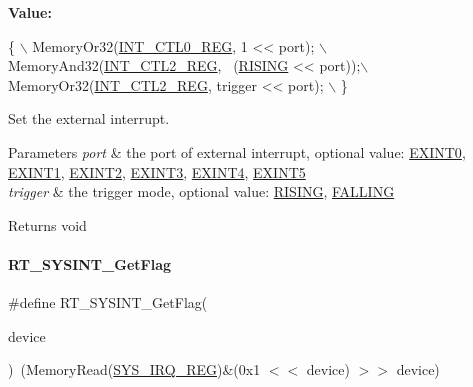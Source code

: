 {\bfseries Value\+:}
\begin{DoxyCode}
\{                                                \(\backslash\)
        MemoryOr32(\mbox{\hyperlink{a00020_adadaa0ab1ebbd7ba9b70dfd24c3ed44da417bb62509b1343f4685a023c8ec4b09}{INT\_CTL0\_REG}}, 1 << port);         \(\backslash\)
        MemoryAnd32(\mbox{\hyperlink{a00020_adadaa0ab1ebbd7ba9b70dfd24c3ed44dafba45e74edabe7b9fd6d0c36e8492bcd}{INT\_CTL2\_REG}}, ~(\mbox{\hyperlink{a00011_aeea2b49478f3b13faedba764985c6e96}{RISING}} << port));\(\backslash\)
        MemoryOr32(\mbox{\hyperlink{a00020_adadaa0ab1ebbd7ba9b70dfd24c3ed44dafba45e74edabe7b9fd6d0c36e8492bcd}{INT\_CTL2\_REG}}, trigger << port);   \(\backslash\)
    \}
\end{DoxyCode}


Set the external interrupt. 


\begin{DoxyParams}{Parameters}
{\em port} & the port of external interrupt, optional value\+: \mbox{\hyperlink{a00011_a2e3f727d359d26314631842394f4a223}{E\+X\+I\+N\+T0}}, \mbox{\hyperlink{a00011_a1ea7d6796165b98f1bc6bf6fe841c3d9}{E\+X\+I\+N\+T1}}, \mbox{\hyperlink{a00011_ac959f4d8aed4e04e25c966e6c8315431}{E\+X\+I\+N\+T2}}, \mbox{\hyperlink{a00011_ae8428c0cbd7362b90ea048bcf59aef2c}{E\+X\+I\+N\+T3}}, \mbox{\hyperlink{a00011_a719b5fa27b5469e1fe2844e9930fa249}{E\+X\+I\+N\+T4}}, \mbox{\hyperlink{a00011_a309fb21107f9f6261cd7e7ca9de6c2f2}{E\+X\+I\+N\+T5}} \\
\hline
{\em trigger} & the trigger mode, optional value\+: \mbox{\hyperlink{a00011_aeea2b49478f3b13faedba764985c6e96}{R\+I\+S\+I\+NG}}, \mbox{\hyperlink{a00011_ac00eb6fc2047dc399280f31b0c5f4472}{F\+A\+L\+L\+I\+NG}} \\
\hline
\end{DoxyParams}
\begin{DoxyReturn}{Returns}
void 
\end{DoxyReturn}
\mbox{\label{a00011_a397366295a7d6d3ed47e5e3d69549448}} 
\paragraph{\texorpdfstring{R\+T\+\_\+\+S\+Y\+S\+I\+N\+T\+\_\+\+Get\+Flag}{RT\_SYSINT\_GetFlag}}
{\footnotesize\ttfamily \#define R\+T\+\_\+\+S\+Y\+S\+I\+N\+T\+\_\+\+Get\+Flag(\begin{DoxyParamCaption}\item[{}]{device }\end{DoxyParamCaption})~(Memory\+Read(\mbox{\hyperlink{a00020_adadaa0ab1ebbd7ba9b70dfd24c3ed44da9c4ce03a199984a23165617318767eca}{S\+Y\+S\+\_\+\+I\+R\+Q\+\_\+\+R\+EG}})\&(0x1 $<$$<$ device) $>$$>$ device)}



